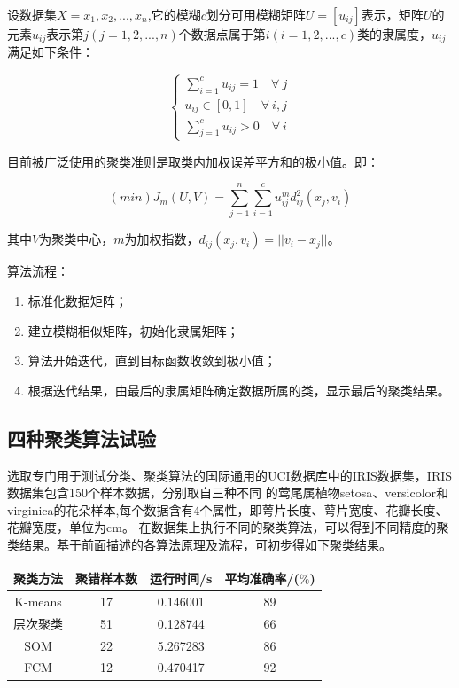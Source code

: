设数据集$X={x_1,x_2,...,x_n}$,它的模糊$c$划分可用模糊矩阵$U=[u_{ij}]$表示，矩阵$U$的元素$u_{ij}$表示第$j(j=1,2,...,n)$个数据点属于第$i(i=1,2,...,c)$类的隶属度，$u_{ij}$满足如下条件：

\begin{equation}
	\left\{
		\begin{array}{lr}
			\sum_{i=1}^c u_{ij}=1 \quad\forall~j
			\\u_{ij}\in[0,1] \quad\forall ~i,j
			\\\sum_{j=1}^c u_{ij}>0 \quad\forall ~i
		\end{array}
	\right.
\end{equation}

目前被广泛使用的聚类准则是取类内加权误差平方和的极小值。即：

$$
(min)J_m(U,V)=\sum^n_{j=1}\sum^c_{i=1}u^m_{ij}d^2_{ij}(x_j,v_i)
$$

其中$V$为聚类中心，$m$为加权指数，$d_{ij}(x_j,v_i)=||v_i-x_j||$。

算法流程：

\begin{enumerate}\itemsep0em
 \item 标准化数据矩阵；
 \item 建立模糊相似矩阵，初始化隶属矩阵；
 \item 算法开始迭代，直到目标函数收敛到极小值；
 \item 根据迭代结果，由最后的隶属矩阵确定数据所属的类，显示最后的聚类结果。
\end{enumerate}

\subsection{四种聚类算法试验}

选取专门用于测试分类、聚类算法的国际通用的UCI数据库中的IRIS数据集，IRIS数据集包含150个样本数据，分别取自三种不同 的莺尾属植物setosa、versicolor和virginica的花朵样本,每个数据含有4个属性，即萼片长度、萼片宽度、花瓣长度、花瓣宽度，单位为cm。 在数据集上执行不同的聚类算法，可以得到不同精度的聚类结果。基于前面描述的各算法原理及流程，可初步得如下聚类结果。

\begin{table}[h]
	\centering
	\begin{tabular}{|c|c|c|c|}\hline
		聚类方法 & 聚错样本数 & 运行时间/s & 平均准确率/($\%$)\\\hline
		K-means  & 17         & 0.146001   & 89               \\\hline
		层次聚类 & 51         & 0.128744   & 66               \\\hline
		SOM      & 22         & 5.267283   & 86               \\\hline
		FCM      & 12         & 0.470417   & 92               \\\hline
	\end{tabular}
\end{table}

